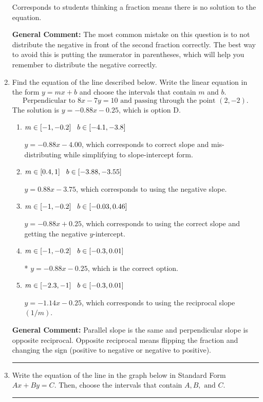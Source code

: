 \documentclass{extbook}[14pt]
\newcommand{\litem}[1]{\item #1

\rule{\textwidth}{0.4pt}}
\begin{document}
\begin{enumerate}
{\begin{enumerate}[label=\Alph*.]
Corresponds to students thinking a fraction means there is no solution to the equation.
\end{enumerate}

\textbf{General Comment:} The most common mistake on this question is to not distribute the negative in front of the second fraction correctly. The best way to avoid this is putting the numerator in parentheses, which will help you remember to distribute the negative correctly.
}
\litem{
Find the equation of the line described below. Write the linear equation in the form $ y=mx+b $ and choose the intervals that contain $m$ and $b$.
\[ \text{Perpendicular to } 8 x - 7 y = 10 \text{ and passing through the point } (2, -2). \]The solution is \( y = -0.88x - 0.25 \), which is option D.\begin{enumerate}[label=\Alph*.]
\item \( m \in [-1, -0.2] \hspace*{3mm} b \in [-4.1, -3.8] \)

 $y = -0.88x - 4.00$, which corresponds to correct slope and mis-distributing while simplifying to slope-intercept form.
\item \( m \in [0.4, 1] \hspace*{3mm} b \in [-3.88, -3.55] \)

 $y = 0.88x - 3.75$, which corresponds to using the negative slope.
\item \( m \in [-1, -0.2] \hspace*{3mm} b \in [-0.03, 0.46] \)

 $y = -0.88x + 0.25$, which corresponds to using the correct slope and getting the negative $y$-intercept.
\item \( m \in [-1, -0.2] \hspace*{3mm} b \in [-0.3, 0.01] \)

* $y = -0.88x - 0.25$, which is the correct option.
\item \( m \in [-2.3, -1] \hspace*{3mm} b \in [-0.3, 0.01] \)

 $y = -1.14x - 0.25$, which corresponds to using the reciprocal slope $(1/m)$.
\end{enumerate}

\textbf{General Comment:} Parallel slope is the same and perpendicular slope is opposite reciprocal. Opposite reciprocal means flipping the fraction and changing the sign (positive to negative or negative to positive).
}
\litem{
Write the equation of the line in the graph below in Standard Form $Ax+By=C$. Then, choose the intervals that contain $A, B, \text{ and } C$.

}
\end{enumerate}
\end{document}
